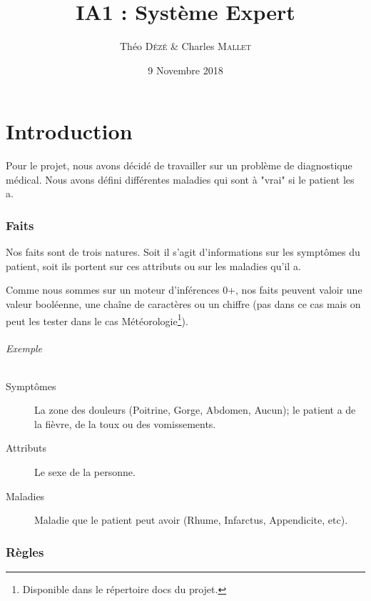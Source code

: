 \documentclass[a4paper, 11pt]{article}
\begin{document}
\title{IA1 : Système Expert}
\author{Théo \textsc{Dézé}  \& Charles \textsc {Mallet}}
\date{9 Novembre 2018} 

\maketitle

\tableofcontents

\pagebreak

\part{Introduction}

Pour le projet, nous avons décidé de travailler sur un problème de diagnostique médical. Nous avons défini différentes maladies qui sont à "vrai" si le patient les a.

\section{Faits}

Nos faits sont de trois natures. Soit il s'agit d'informations sur les symptômes du patient, soit ils portent sur ces attributs ou sur les maladies qu'il a. 

Comme nous sommes sur un moteur d'inférences 0+, nos faits peuvent valoir une valeur booléenne, une chaîne de caractères ou un chiffre (pas dans ce cas mais on peut les tester dans le cas Météorologie\footnote{Disponible dans le répertoire docs du projet.}).

\paragraph{Exemple}

\begin{description}
    \item[Symptômes] La zone des douleurs (Poitrine, Gorge, Abdomen, Aucun); le patient a de la fièvre, de la toux ou des vomissements.
    \item[Attributs] Le sexe de la personne.
    \item[Maladies] Maladie que le patient peut avoir (Rhume, Infarctus, Appendicite, etc).
\end{description}

\section{Règles}
\end{document}
